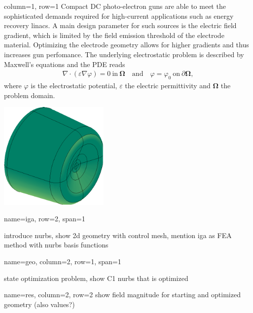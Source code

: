 \documentclass[
   accentcolor=9b,
   boxstyle=boxed
   ]{tudasciposter}
\begin{document}
\begin{tcbposter}[poster={columns=2, rows=2, spacing=1cm}]

\begin{posterboxenv}[title=Motivation]{column=1, row=1}
   Compact DC photo-electron guns are able to meet the sophisticated demands required for high-current applications such as energy recovery linacs. A main design parameter for such sources is the electric field gradient, which is limited by the field emission threshold of the electrode material. Optimizing the electrode geometry allows for higher gradients and thus increases gun perfomance.
   The underlying electrostatic problem is described by Maxwell's equations and the PDE reads
   \begin{align*}
      \nabla \cdot (\varepsilon \nabla \varphi) = 0\ \mathrm{in}\ \boldsymbol{\Omega} \quad \mathrm{and} \quad \varphi = \varphi_0\ \mathrm{on}\ \partial \boldsymbol{\Omega},
   \end{align*}
   where $\varphi$ is the electrostatic potential, $\varepsilon$ the electric permittivity and $\boldsymbol{\Omega}$ the problem domain.

   \begin{center}
      \includegraphics[width=0.4\textwidth]{electrode.pdf}
   \end{center}
\end{posterboxenv}

\begin{posterboxenv}[title=Isogeometric Analysis]{name=iga, row=2, span=1}
   introduce nurbs, show 2d geometry with control mesh, mention iga as FEA method with nurbs basis functions
\end{posterboxenv}

\begin{posterboxenv}[title=Geometry Optimization]{name=geo, column=2, row=1, span=1}
      
      
   state optimization problem, show C1 nurbs that is optimized
\end{posterboxenv}


\begin{posterboxenv}[title=Results]{name=res, column=2, row=2}
   show field magnitude for starting and optimized geometry (also values?)
\end{posterboxenv}

\end{tcbposter}
\end{document}
